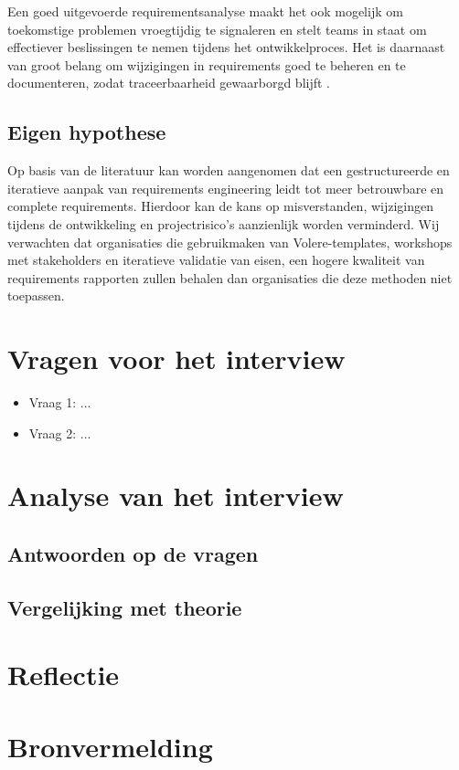 \documentclass[dutch,dit,thesis]{hogentreport}
\begin{document}
Een goed uitgevoerde requirementsanalyse maakt het ook mogelijk om toekomstige problemen vroegtijdig te signaleren en stelt teams in staat om effectiever beslissingen te nemen tijdens het ontwikkelproces. Het is daarnaast van groot belang om wijzigingen in requirements goed te beheren en te documenteren, zodat traceerbaarheid gewaarborgd blijft \parencite{wiegers2013}.

\section*{Eigen hypothese}

Op basis van de literatuur kan worden aangenomen dat een gestructureerde en iteratieve aanpak van requirements engineering leidt tot meer betrouwbare en complete requirements. Hierdoor kan de kans op misverstanden, wijzigingen tijdens de ontwikkeling en projectrisico’s aanzienlijk worden verminderd. Wij verwachten dat organisaties die gebruikmaken van Volere-templates, workshops met stakeholders en iteratieve validatie van eisen, een hogere kwaliteit van requirements rapporten zullen behalen dan organisaties die deze methoden niet toepassen.

\chapter{Vragen voor het interview}
\begin{itemize}
    \item Vraag 1: ...
    \item Vraag 2: ...
\end{itemize}

\chapter{Analyse van het interview}
\section*{Antwoorden op de vragen}
\lipsum[3]

\section*{Vergelijking met theorie}
\lipsum[4]

\chapter{Reflectie}
\lipsum[5]

\chapter*{Bronvermelding}

\backmatter{}
\printbibliography[heading=bibintoc]
\end{document}
